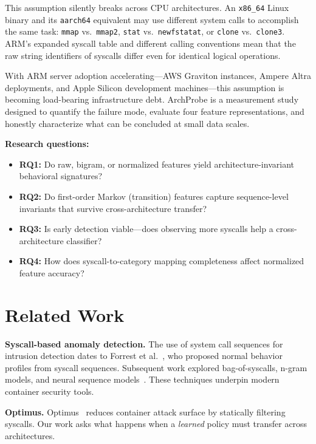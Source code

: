 \documentclass[10pt,twocolumn]{article}
\begin{document}
This assumption silently breaks across CPU architectures. An \texttt{x86\_64}
Linux binary and its \texttt{aarch64} equivalent may use different system calls
to accomplish the same task: \texttt{mmap} vs.\ \texttt{mmap2}, \texttt{stat}
vs.\ \texttt{newfstatat}, or \texttt{clone} vs.\ \texttt{clone3}. ARM's
expanded syscall table and different calling conventions mean that the raw
string identifiers of syscalls differ even for identical logical operations.

With ARM server adoption accelerating---AWS Graviton instances, Ampere Altra
deployments, and Apple Silicon development machines---this assumption is
becoming load-bearing infrastructure debt. ArchProbe is a measurement study
designed to quantify the failure mode, evaluate four feature representations,
and honestly characterize what can be concluded at small data scales.

\textbf{Research questions:}
\begin{itemize}
  \item \textbf{RQ1:} Do raw, bigram, or normalized features yield
    architecture-invariant behavioral signatures?
  \item \textbf{RQ2:} Do first-order Markov (transition) features capture
    sequence-level invariants that survive cross-architecture transfer?
  \item \textbf{RQ3:} Is early detection viable---does observing more syscalls
    help a cross-architecture classifier?
  \item \textbf{RQ4:} How does syscall-to-category mapping completeness affect
    normalized feature accuracy?
\end{itemize}

\section{Related Work}

\textbf{Syscall-based anomaly detection.}
The use of system call sequences for intrusion detection dates to Forrest et
al.~\cite{forrest1996}, who proposed normal behavior profiles from syscall
sequences. Subsequent work explored bag-of-syscalls, n-gram models, and neural
sequence models~\cite{abed2015}. These techniques underpin modern container
security tools.

\textbf{Optimus.}
Optimus~\cite{optimus} reduces container attack surface by statically filtering
syscalls. Our work asks what happens when a \emph{learned} policy must transfer
across architectures.
\end{document}
